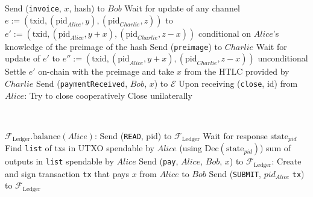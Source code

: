 \begin{algorithmic}[1]
      \State Send (\texttt{invoice}, $x$, hash) to $Bob$
      \State Wait for update of any channel $e := \left(\mathrm{txid},
      \left(\mathrm{pid}_{Alice}, y\right), \left(\mathrm{pid}_{Charlie}, z\right)\right)$
      to $e' := \left(\mathrm{txid}, \left(\mathrm{pid}_{Alice}, y + x\right),
      \left(\mathrm{pid}_{Charlie}, z - x\right)\right)$ conditional on $Alice$'s
      knowledge of the preimage of the hash
      \State Send (\texttt{preimage}) to $Charlie$
      \State Wait for update of $e'$ to $e'' := \left(\mathrm{txid},
      \left(\mathrm{pid}_{Alice}, y + x\right), \left(\mathrm{pid}_{Charlie}, z -
      x\right)\right)$ unconditional
        \State Settle $e'$ on-chain with the preimage and take $x$ from the HTLC provided
        by $Charlie$
      \EndIf
      \State Send (\texttt{paymentReceived}, $Bob$, $x$) to $\mathcal{E}$
    \State
    \State Upon receiving (\texttt{close}, id) from $Alice$:
        \State Try to close cooperatively 
         
          \State Close unilaterally 
        \EndIf
      \EndIf
  \end{algorithmic}
\hrulefill
\ \\ 
  \label{alg:temp:formalfledger}
  \begin{algorithmic}[1]
    \State $\mathcal{F}_{\mathrm{Ledger}}\mathrm{.balance}\left(Alice\right)$:
    \State
    \State Send (\texttt{READ}, pid) to $\mathcal{F}_{\mathrm{Ledger}}$ 
    \State Wait for response $\mathrm{state}_{pid}$
    \State Find \texttt{list} of txs in UTXO spendable by $Alice$ (using
    $\mathrm{Dec}\left(\mathrm{state}_{pid}\right)$) 
    \State \Return sum of outputs in \texttt{list} spendable by $Alice$ 
    \State
    \State
    \State Send (\texttt{pay}, $Alice$, $Bob$, $x$) to $\mathcal{F}_{\mathrm{Ledger}}$:
    \State
    \State Create and sign transaction \texttt{tx} that pays $x$ from $Alice$ to $Bob$
    \State Send (\texttt{SUBMIT}, $pid_{Alice}$ \texttt{tx}) to
    $\mathcal{F}_{\mathrm{Ledger}}$
  \end{algorithmic}
\hrulefill
